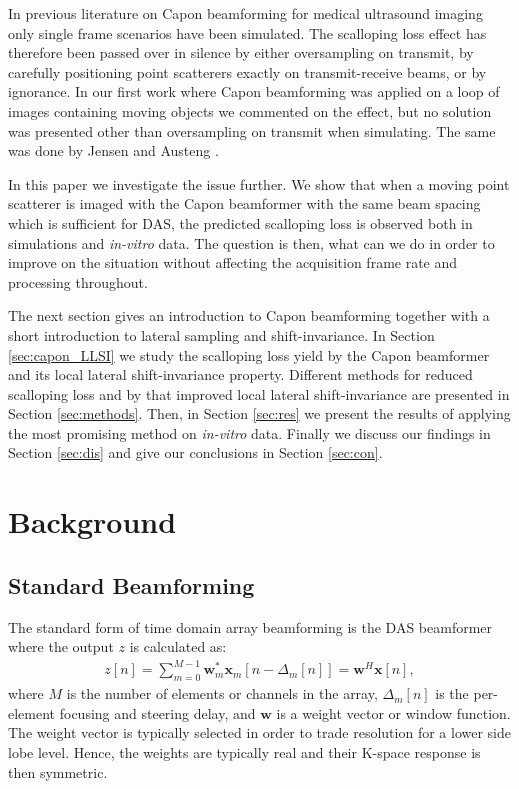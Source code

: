 \documentclass[draftcls]{IEEEtran}
\renewcommand{\vec}[1]{\mathbf{#1}}
\newcommand\comment[1]{\textit{{\color{red}(#1)}}}
\begin{document}
In previous literature on Capon beamforming for medical ultrasound imaging only single frame scenarios have been simulated. The scalloping loss effect has therefore been passed over in silence by either oversampling on transmit, by carefully positioning point scatterers exactly on transmit-receive beams, or by ignorance. In our first work where Capon beamforming was applied on a loop of images containing moving objects \cite{Asen2012, Asen} we commented on the effect, but no solution was presented other than oversampling on transmit when simulating. The same was done by Jensen and Austeng \cite{Jensen2012}.

In this paper we investigate the issue further. We show that when a moving point scatterer is imaged with the Capon beamformer with the same beam spacing which is sufficient for DAS, the predicted scalloping loss is observed both in simulations and \textit{in-vitro} data. The question is then, what can we do in order to improve on the situation without affecting the acquisition frame rate and processing throughout. %

The next section gives an introduction to Capon beamforming together with a short introduction to lateral sampling and shift-invariance. In Section \ref{sec:capon_LLSI} we study the scalloping loss yield by the Capon beamformer and its local lateral shift-invariance property.  Different methods for reduced scalloping loss and by that improved local lateral shift-invariance are presented in Section \ref{sec:methods}. Then, in Section \ref{sec:res} we present the results of applying the most promising method on \textit{in-vitro} data. Finally we discuss our findings in Section \ref{sec:dis} and give our conclusions in Section \ref{sec:con}.



\section{Background}
\subsection{Standard Beamforming}
The standard form of time domain array beamforming is the DAS beamformer where the output $z$ is calculated as:
\begin{align}\label{eq:das}
z[n] = \sum_{m = 0}^{M-1}\vec{w}_m^*\vec{x}_m[n - \Delta_m[n]] = \vec{w}^H\vec{x}[n],
\end{align}
where $M$ is the number of elements or channels in the array, $\Delta_m[n]$ is the per-element focusing and steering delay, and $\vec{w}$ is a weight vector or window function. The weight vector is typically selected in order to trade resolution for a lower side lobe level. Hence, the weights are typically real and their K-space response is then symmetric.
\end{document}
